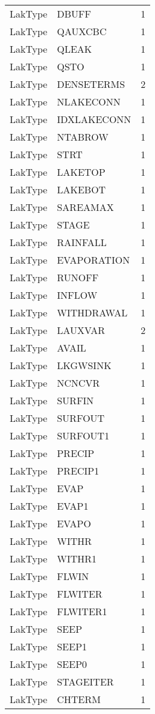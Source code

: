 \begin{longtable}{p{6cm} p{4cm} p{2cm} }
LakType &  DBUFF & 1 \\ 
LakType &  QAUXCBC & 1 \\ 
LakType &  QLEAK & 1 \\ 
LakType &  QSTO & 1 \\ 
LakType &  DENSETERMS & 2 \\ 
LakType &  NLAKECONN & 1 \\ 
LakType &  IDXLAKECONN & 1 \\ 
LakType &  NTABROW & 1 \\ 
LakType &  STRT & 1 \\ 
LakType &  LAKETOP & 1 \\ 
LakType &  LAKEBOT & 1 \\ 
LakType &  SAREAMAX & 1 \\ 
LakType &  STAGE & 1 \\ 
LakType &  RAINFALL & 1 \\ 
LakType &  EVAPORATION & 1 \\ 
LakType &  RUNOFF & 1 \\ 
LakType &  INFLOW & 1 \\ 
LakType &  WITHDRAWAL & 1 \\ 
LakType &  LAUXVAR & 2 \\ 
LakType &  AVAIL & 1 \\ 
LakType &  LKGWSINK & 1 \\ 
LakType &  NCNCVR & 1 \\ 
LakType &  SURFIN & 1 \\ 
LakType &  SURFOUT & 1 \\ 
LakType &  SURFOUT1 & 1 \\ 
LakType &  PRECIP & 1 \\ 
LakType &  PRECIP1 & 1 \\ 
LakType &  EVAP & 1 \\ 
LakType &  EVAP1 & 1 \\ 
LakType &  EVAPO & 1 \\ 
LakType &  WITHR & 1 \\ 
LakType &  WITHR1 & 1 \\ 
LakType &  FLWIN & 1 \\ 
LakType &  FLWITER & 1 \\ 
LakType &  FLWITER1 & 1 \\ 
LakType &  SEEP & 1 \\ 
LakType &  SEEP1 & 1 \\ 
LakType &  SEEP0 & 1 \\ 
LakType &  STAGEITER & 1 \\ 
LakType &  CHTERM & 1 \\ 

\end{longtable}
